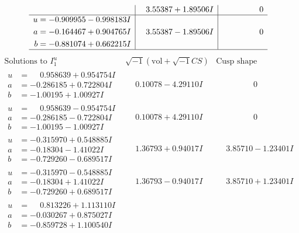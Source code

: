 \documentclass[1p]{elsarticle_modified}
\theoremstyle{definition}
\newcommand{\I}{\sqrt{-1}}
\begin{document}
$$\begin{array}{c|c|c}
 & \phantom{-}3.55387 + 1.89506 I & \phantom{-0.000000 } 0 \\ \hline\begin{aligned}
u &= -0.909955 - 0.998183 I \\
a &= -0.164467 + 0.904765 I \\
b &= -0.881074 + 0.662215 I\end{aligned}
 & \phantom{-}3.55387 - 1.89506 I & \phantom{-0.000000 } 0\\
 \hline 
 \end{array}$$\newpage$$\begin{array}{c|c|c}  
\text{Solutions to }I^u_{1}& \I (\text{vol} + \sqrt{-1}CS) & \text{Cusp shape}\\
 \hline 
\begin{aligned}
u &= \phantom{-}0.958639 + 0.954754 I \\
a &= -0.286185 + 0.722804 I \\
b &= -1.00195 + 1.00927 I\end{aligned}
 & \phantom{-}0.10078 - 4.29110 I & \phantom{-0.000000 } 0 \\ \hline\begin{aligned}
u &= \phantom{-}0.958639 - 0.954754 I \\
a &= -0.286185 - 0.722804 I \\
b &= -1.00195 - 1.00927 I\end{aligned}
 & \phantom{-}0.10078 + 4.29110 I & \phantom{-0.000000 } 0 \\ \hline\begin{aligned}
u &= -0.315970 + 0.548885 I \\
a &= -0.18304 - 1.41022 I \\
b &= -0.729260 - 0.689517 I\end{aligned}
 & \phantom{-}1.36793 + 0.94017 I & \phantom{-}3.85710 - 1.23401 I \\ \hline\begin{aligned}
u &= -0.315970 - 0.548885 I \\
a &= -0.18304 + 1.41022 I \\
b &= -0.729260 + 0.689517 I\end{aligned}
 & \phantom{-}1.36793 - 0.94017 I & \phantom{-}3.85710 + 1.23401 I \\ \hline\begin{aligned}
u &= \phantom{-}0.813226 + 1.113110 I \\
a &= -0.030267 + 0.875027 I \\
b &= -0.859728 + 1.100540 I\end{aligned}

\end{array}$$
\end{document}
